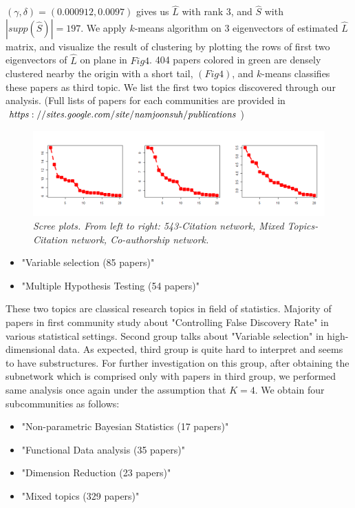 \documentclass{article}
\begin{document}
\noindent $(\gamma,\delta) = (0.000912,0.0097)$ gives us $\hat{L}$ with rank 3, and $\hat{S}$ with $|supp(\hat{S})|=197$. We apply $k$-means algorithm on 3 eigenvectors of estimated $\hat{L}$ matrix, and visualize the result of clustering by plotting the rows of first two eigenvectors of $\hat{L}$ on plane in $Fig 4$. 404 papers colored in green are densely clustered nearby the origin with a short tail, $(Fig 4)$, and $k$-means classifies these papers as third topic. We list the first two topics discovered through our analysis. (Full lists of papers for each communities are provided in $\it https://sites.google.com/site/namjoonsuh/publications$)

\begin{figure}[!h]
\includegraphics[width=1\textwidth]{Fig4.png}
\caption{\it Scree plots. From left to right: 543-Citation network, Mixed Topics-Citation network, Co-authorship network.}
\label{fig:figure1}
\end{figure}

\begin{itemize}
  \item "Variable selection (85 papers)" 
  \item "Multiple Hypothesis Testing (54 papers)"
\end{itemize}

\noindent These two topics are classical research topics in field of statistics. Majority of papers in first community study about "Controlling False Discovery Rate" in various statistical settings. Second group talks about "Variable selection" in high-dimensional data. As expected, third group is quite hard to interpret and seems to have substructures. For further investigation on this group, after obtaining the subnetwork which is comprised only with papers in third group, we performed same analysis once again under the assumption that $K=4$. We obtain four subcommunities as follows: 

\begin{itemize}
  \item "Non-parametric Bayesian Statistics (17 papers)"
  \item "Functional Data analysis (35 papers)"
  \item "Dimension Reduction (23 papers)"
  \item "Mixed topics (329 papers)"
\end{itemize}
\end{document}
